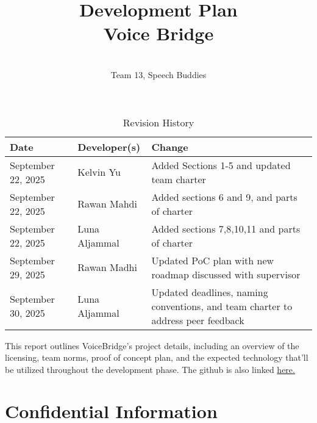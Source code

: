 \documentclass{article}
\title{Development Plan\\ Voice Bridge}
\author{\\ Team 13, Speech Buddies}
\date{}
\begin{document}
\maketitle

\begin{table}[hp]
\caption{Revision History} \label{TblRevisionHistory}
\begin{tabularx}{\textwidth}{llX}
\toprule
\textbf{Date} & \textbf{Developer(s)} & \textbf{Change}\\
\midrule
September 22, 2025 & Kelvin Yu & Added Sections 1-5 and updated team charter\\
September 22, 2025 & Rawan Mahdi & Added sections 6 and 9, and parts of charter \\
September 22, 2025 & Luna Aljammal & Added sections 7,8,10,11 and parts of charter \\
September 29, 2025 & Rawan Madhi & Updated PoC plan with new roadmap discussed with supervisor\\
September 30, 2025 & Luna Aljammal & Updated deadlines, naming conventions, and team charter to address peer feedback \\

\bottomrule
\end{tabularx}
\end{table}

\newpage{}

\begin{comment}\wss{Put your introductory blurb here.  Often the blurb is a brief roadmap of
what is contained in the report.}
\end{comment}

This report outlines VoiceBridge’s project details, including an overview of the licensing, team norms, proof of concept plan, and the expected technology that’ll be utilized throughout the development phase. 
The github is also linked \href{https://github.com/orgs/speech-buddies/projects/1}{here.} 

\begin{comment}\wss{Additional information on the development plan can be found in the
\href{https://gitlab.cas.mcmaster.ca/courses/capstone/-/blob/main/Lectures/L02b_POCAndDevPlan/POCAndDevPlan.pdf?ref_type=heads}
{lecture slides}.}
\end{comment}



\section{Confidential Information}
\end{document}
